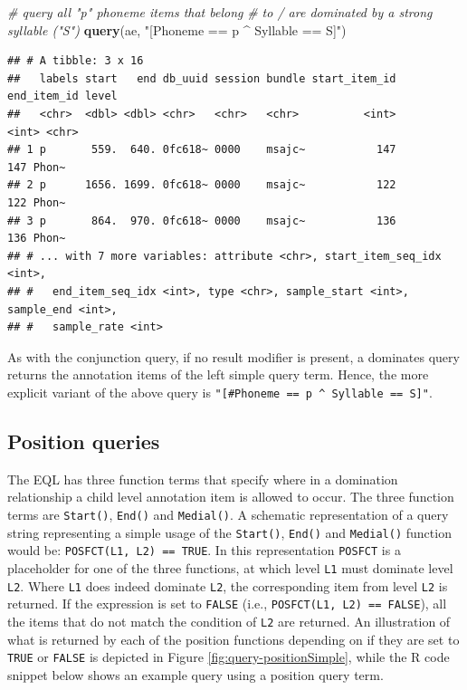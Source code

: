 \documentclass[]{book}
\newenvironment{Shaded}{\begin{snugshade}}{\end{snugshade}}
\newcommand{\CommentTok}[1]{\textcolor[rgb]{0.56,0.35,0.01}{\textit{#1}}}
\newcommand{\KeywordTok}[1]{\textcolor[rgb]{0.13,0.29,0.53}{\textbf{#1}}}
\newcommand{\NormalTok}[1]{#1}
\newcommand{\StringTok}[1]{\textcolor[rgb]{0.31,0.60,0.02}{#1}}
\begin{document}
\begin{Shaded}
\begin{Highlighting}[]
\CommentTok{# query all "p" phoneme items that belong}
\CommentTok{# to / are dominated by a strong syllable ("S")}
\KeywordTok{query}\NormalTok{(ae, }\StringTok{"[Phoneme == p ^ Syllable == S]"}\NormalTok{)}
\end{Highlighting}
\end{Shaded}

\begin{verbatim}
## # A tibble: 3 x 16
##   labels start   end db_uuid session bundle start_item_id end_item_id level
##   <chr>  <dbl> <dbl> <chr>   <chr>   <chr>          <int>       <int> <chr>
## 1 p       559.  640. 0fc618~ 0000    msajc~           147         147 Phon~
## 2 p      1656. 1699. 0fc618~ 0000    msajc~           122         122 Phon~
## 3 p       864.  970. 0fc618~ 0000    msajc~           136         136 Phon~
## # ... with 7 more variables: attribute <chr>, start_item_seq_idx <int>,
## #   end_item_seq_idx <int>, type <chr>, sample_start <int>, sample_end <int>,
## #   sample_rate <int>
\end{verbatim}

As with the conjunction query, if no result modifier is present, a dominates query returns the annotation items of the left simple query term. Hence, the more explicit variant of the above query is \texttt{"{[}\#Phoneme\ ==\ p\ \^{}\ Syllable\ ==\ S{]}"}.

\hypertarget{subsec:query-positionQueries}{%
\subsection{Position queries}\label{subsec:query-positionQueries}}

The EQL has three function terms that specify where in a domination relationship a child level annotation item is allowed to occur. The three function terms are \texttt{Start()}, \texttt{End()} and \texttt{Medial()}. A schematic representation of a query string representing a simple usage of the \texttt{Start()}, \texttt{End()} and \texttt{Medial()} function would be: \texttt{POSFCT(L1,\ L2)\ ==\ TRUE}. In this representation \texttt{POSFCT} is a placeholder for one of the three functions, at which level \texttt{L1} must dominate level \texttt{L2}. Where \texttt{L1} does indeed dominate \texttt{L2}, the corresponding item from level \texttt{L2} is returned. If the expression is set to \texttt{FALSE} (i.e., \texttt{POSFCT(L1,\ L2)\ ==\ FALSE}), all the items that do not match the condition of \texttt{L2} are returned. An illustration of what is returned by each of the position functions depending on if they are set to \texttt{TRUE} or \texttt{FALSE} is depicted in Figure \ref{fig:query-positionSimple}, while the R code snippet below shows an example query using a position query term.
\end{document}
